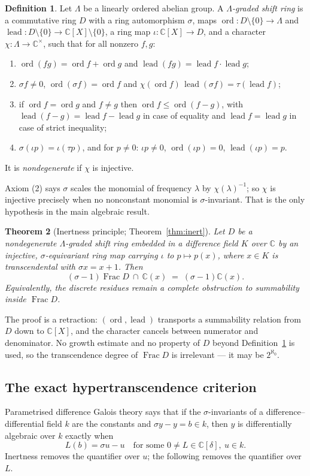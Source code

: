 \documentclass[11pt,a4paper]{amsart}
\theoremstyle{plain}
\newtheorem{theorem}{Theorem}[section]
\theoremstyle{definition}
\newtheorem{definition}[theorem]{Definition}
\newcommand{\CC}{\mathbb{C}}
\newcommand{\sig}{\sigma}
\newcommand{\dd}{\delta}
\newcommand{\ord}{\operatorname{ord}}
\newcommand{\lead}{\operatorname{lead}}
\newcommand{\Frac}{\operatorname{Frac}}
\begin{document}
\begin{definition}\label{def:graded}
Let $\Lambda$ be a linearly ordered abelian group. A \emph{$\Lambda$-graded shift ring} is a
commutative ring $D$ with a ring automorphism $\sig$, maps $\ord\colon D\setminus\{0\}\to\Lambda$ and
$\lead\colon D\setminus\{0\}\to\CC[X]\setminus\{0\}$, a ring map $\iota\colon\CC[X]\to D$, and a
character $\chi\colon\Lambda\to\CC^{\times}$, such that for all nonzero $f,g$:
\begin{enumerate}
\item $\ord(fg)=\ord f+\ord g$ and $\lead(fg)=\lead f\cdot\lead g$;
\item $\sig f\neq0$, $\ord(\sig f)=\ord f$ and $\chi(\ord f)\,\lead(\sig f)=\tau(\lead f)$;
\item if $\ord f=\ord g$ and $f\neq g$ then $\ord f\le\ord(f-g)$, with $\lead(f-g)=\lead f-\lead g$
  in case of equality and $\lead f=\lead g$ in case of strict inequality;
\item $\sig(\iota p)=\iota(\tau p)$, and for $p\neq0$: $\iota p\neq0$, $\ord(\iota p)=0$,
  $\lead(\iota p)=p$.
\end{enumerate}
It is \emph{nondegenerate} if $\chi$ is injective.
\end{definition}

Axiom (2) says $\sig$ scales the monomial of frequency $\lambda$ by $\chi(\lambda)^{-1}$; so $\chi$
is injective precisely when no nonconstant monomial is $\sig$-invariant. That is the only hypothesis
in the main algebraic result.

\begin{theorem}[Inertness principle; Theorem~\ref{thm:inert}]\label{thm:A}
Let $D$ be a nondegenerate $\Lambda$-graded shift ring embedded in a difference field $K$ over $\CC$
by an injective, $\sig$-equivariant ring map carrying $\iota$ to $p\mapsto p(x)$, where $x\in K$ is
transcendental with $\sig x=x+1$. Then
\[
  (\sig-1)\Frac D\ \cap\ \CC(x)\;=\;(\sig-1)\CC(x).
\]
Equivalently, the discrete residues remain a complete obstruction to summability inside $\Frac D$.
\end{theorem}

The proof is a retraction: $(\ord,\lead)$ transports a summability relation from $D$ down to
$\CC[X]$, and the character cancels between numerator and denominator. No growth estimate and no
property of $D$ beyond Definition~\ref{def:graded} is used, so the transcendence degree of $\Frac D$
is irrelevant --- it may be $2^{\aleph_0}$.

\subsection{The exact hypertranscendence criterion}
Parametrised difference Galois theory \cite{HardouinSinger2008,ADH2021} says that if the
$\sig$-invariants of a difference--differential field $k$ are the constants and $\sig y-y=b\in k$,
then $y$ is differentially algebraic over $k$ exactly when
\begin{equation}\label{eq:HS}
  L(b)=\sig u-u\quad\text{for some }0\neq L\in\CC[\dd],\ u\in k .
\end{equation}
Inertness removes the quantifier over $u$; the following removes the quantifier over $L$.
\end{document}
